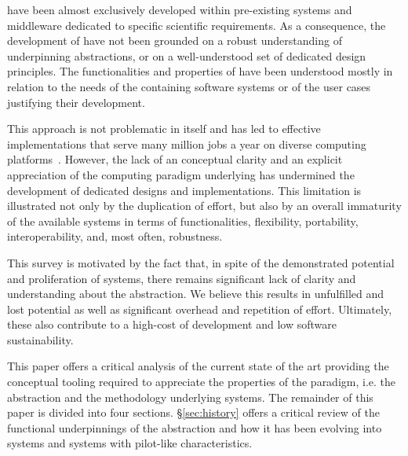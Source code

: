\documentclass{sig-alternate}
\begin{document}



\pilotjobs have been almost exclusively developed within pre-existing systems
and middleware dedicated to specific scientific requirements. As a consequence,
the development of \pilotjobs have not been grounded on a robust understanding
of underpinning abstractions, or on a well-understood set of dedicated design
principles. The functionalities and properties of \pilotjobs have been
understood mostly in relation to the needs of the containing software systems or
of the user cases justifying their development.

This approach is not problematic in itself and has led to effective
implementations that serve many million jobs a year on diverse computing
platforms~\cite{maeno2014evolution,katz2012}. However, the lack of an conceptual
clarity and an explicit appreciation of the computing paradigm underlying
\pilotjobs has undermined the development of dedicated designs and
implementations. This limitation is illustrated not only by the duplication of
effort, but also by an overall immaturity of the available systems in terms of
functionalities, flexibility, portability, interoperability, and, most often,
robustness.

This survey is motivated by the fact that, in spite of the demonstrated
potential and proliferation of \pilotjob systems, there remains significant lack
of clarity and understanding about the \pilotjob abstraction. We believe this
results in unfulfilled and lost potential as well as significant overhead and
repetition of effort. Ultimately, these also contribute to a high-cost of
development and low software sustainability.


This paper offers a critical analysis of the current state of the art providing
the conceptual tooling required to appreciate the properties of the \pilot
paradigm, i.e. the abstraction and the methodology underlying \pilotjobs
systems. The remainder of this paper is divided into four sections.
\S\ref{sec:history} offers a critical review of the functional underpinnings of
the \pilot abstraction and how it has been evolving into \pilotjob systems and
systems with pilot-like characteristics.
\end{document}
